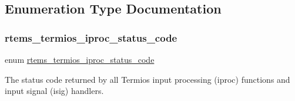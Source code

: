 \subsection{Enumeration Type Documentation}
\mbox{\label{group__Termios_ga8d00143bb99772a960e237f16437fc1b}} 
\subsubsection{\texorpdfstring{rtems\_termios\_iproc\_status\_code}{rtems\_termios\_iproc\_status\_code}}
{\footnotesize\ttfamily enum \mbox{\hyperlink{group__Termios_ga8d00143bb99772a960e237f16437fc1b}{rtems\+\_\+termios\+\_\+iproc\+\_\+status\+\_\+code}}}



The status code returned by all Termios input processing (iproc) functions and input signal (isig) handlers. 

